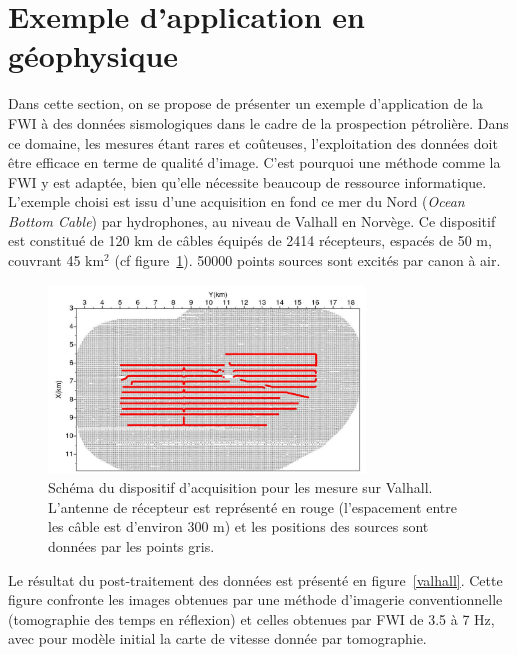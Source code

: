 \section{Exemple d'application en géophysique}

Dans cette section, on se propose de présenter un exemple d'application de la FWI à des données sismologiques dans le cadre de la prospection pétrolière. Dans ce domaine, les mesures étant rares et coûteuses, l'exploitation des données doit être efficace en terme de qualité d'image. C'est pourquoi une méthode comme la FWI y est adaptée, bien qu'elle nécessite beaucoup de ressource informatique.\\

L'exemple choisi est issu d'une acquisition en fond ce mer du Nord (\emph{Ocean Bottom Cable}) par hydrophones, au niveau de Valhall en Norvège. Ce dispositif est constitué de 120 km de câbles équipés de 2414 récepteurs, espacés de 50 m, couvrant 45 km$^{2}$ (cf figure~\ref{dispositif_valhall}). 50000 points sources sont excités par canon à air.

\begin{figure}[!h]
	\centering
	\includegraphics[height=5cm]{img/dispo_valhall.jpg}
	\caption{Schéma du dispositif d'acquisition pour les mesure sur Valhall. L'antenne de récepteur est représenté en rouge (l'espacement entre les câble est d'environ 300 m) et les positions des sources sont données par les points gris.\label{dispositif_valhall}}
\end{figure}

Le résultat du post-traitement des données  est présenté en figure~\ref{valhall}. Cette figure confronte les images obtenues par une méthode d'imagerie conventionnelle (tomographie des temps en réflexion) et celles obtenues par FWI de 3.5 à 7 Hz, avec pour modèle initial la carte de vitesse donnée par tomographie.


